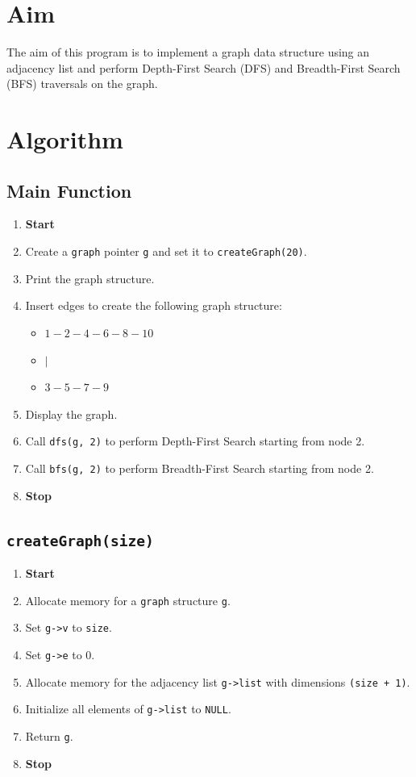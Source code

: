 
\section{Aim}
The aim of this program is to implement a graph data structure using an adjacency list and perform Depth-First Search (DFS) and Breadth-First Search (BFS) traversals on the graph.

\section{Algorithm}
 {\selectfont
  \subsection{Main Function}
  \begin{enumerate}[label=\arabic*:,left=0pt]
    \item \textbf{Start}
    \item Create a \texttt{graph} pointer \texttt{g} and set it to \texttt{createGraph(20)}.
    \item Print the graph structure.
    \item Insert edges to create the following graph structure:
          \begin{itemize}
            \item \(1 - 2 - 4 - 6 - 8 - 10\)
            \item \(|\)
            \item \(3 - 5 - 7 - 9\)
          \end{itemize}
    \item Display the graph.
    \item Call \texttt{dfs(g, 2)} to perform Depth-First Search starting from node 2.
    \item Call \texttt{bfs(g, 2)} to perform Breadth-First Search starting from node 2.
    \item \textbf{Stop}
  \end{enumerate}

  \subsection{\texttt{createGraph(size)}}
  \begin{enumerate}[label=\arabic*:,left=0pt]
    \item \textbf{Start}
    \item Allocate memory for a \texttt{graph} structure \texttt{g}.
    \item Set \texttt{g->v} to \texttt{size}.
    \item Set \texttt{g->e} to 0.
    \item Allocate memory for the adjacency list \texttt{g->list} with dimensions \texttt{(size + 1)}.
    \item Initialize all elements of \texttt{g->list} to \texttt{NULL}.
    \item Return \texttt{g}.
    \item \textbf{Stop}
  \end{enumerate}

}
